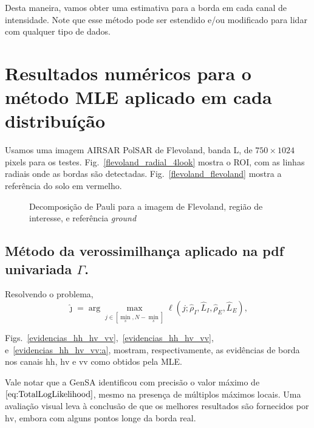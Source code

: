 Desta maneira, vamos obter uma estimativa para a borda em cada canal de intensidade.
Note que esse método pode ser estendido e/ou modificado para lidar com qualquer tipo de dados.

\section{Resultados numéricos para o método MLE aplicado em cada distribuíção}

Usamos uma imagem AIRSAR PolSAR de Flevoland, banda L, de $750\times 1024$ pixels para os testes.  Fig.~\ref{flevoland_radial_4look} mostra o ROI, com as linhas radiais onde as bordas são detectadas. Fig.~\ref{flevoland_flevoland} mostra a referência do solo em vermelho.  
  \begin{figure}[hbt]
   \centering
     \subfloat[Imagem, Região de Interesse (ROI), and radiais. \label{flevoland_radial_4look}]{%
       \texttt{[image: flevoland\_radial\_4\_look\_black\_crop]}}
    \caption{Decomposição de Pauli para a imagem de Flevoland, região de interesse, e referência \textit{ground}}
    \label{roi_gt}
\end{figure}

\subsection{Método da verossimilhança aplicado na pdf univariada $\Gamma$.}
Resolvendo o problema,
$$
\widehat{\jmath}= \arg\max\limits_{j\in [\min_s,N-\min_s]}\ell(j;\widehat{\rho}_I, \widehat{L}_I,\widehat{\rho}_E, \widehat{L}_E),
$$

Figs.~\ref{evidencias_hh_hv_vv},~\ref{evidencias_hh_hv_vv}, e~\ref{evidencias_hh_hv_vv:a}, mostram, respectivamente, as evidências de borda nos canais $\text{hh}$, $\text{hv}$ e $\text{vv}$ como obtidos pela MLE.

Vale notar que a GenSA identificou com precisão o valor máximo de $\eqref{eq:TotalLogLikelihood}$, mesmo na presença de múltiplos máximos locais. 
Uma avaliação visual leva à conclusão de que os melhores resultados são fornecidos por $\text{hv}$, embora com alguns pontos longe da borda real.

